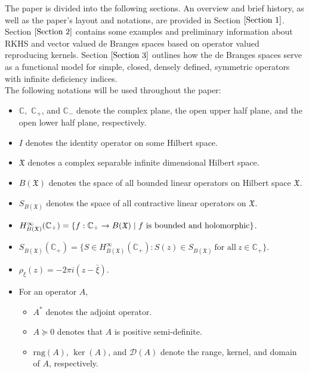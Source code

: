 \documentclass [12pt,reqno]{amsart}
\numberwithin{equation}{subsection}
\numberwithin{equation}{section}
\begin{document}
The paper is divided into the following sections. An overview and brief history, as well as the paper's layout and notations, are provided in Section $\ref{Section 1}$. Section $\ref{Section 2}$ contains some examples and preliminary information about RKHS and vector valued de Branges spaces based on operator valued reproducing kernels. Section $\ref{Section 3}$ outlines how the de Branges spaces serve as a functional model for simple, closed, densely defined, symmetric operators with infinite deficiency indices.
\\
The following notations will be used throughout the paper: 
\begin{itemize} 
\item $\mathbb{C},$ $\mathbb{C}_+$, and $\mathbb{C}_-$ denote the complex plane, the open upper half plane, and the open lower half plane, respectively. 
\item  $I$ denotes the identity operator on some Hilbert space.
\item $\mathfrak{X}$ denotes a complex separable infinite dimensional Hilbert space.
\item $B(\mathfrak{X})$ denotes the space of all bounded linear operators on Hilbert space $\mathfrak{X}$.
\item $S_{B(\mathfrak{X})}$ denotes the space of all contractive linear operators on $\mathfrak{X}.$
\item $H^{\infty}_{B(\mathfrak{X})}(\mathbb{C}_+)= \{ f: \mathbb{C}_+ \rightarrow B(\mathfrak{X}) \hspace{0.1cm}\vert\hspace{0.1cm} f~ \mbox{is bounded and holomorphic} \}$.
\item $S_{B(\mathfrak{X})}(\mathbb{C}_+) = \bigl \{ S \in H^{\infty}_{B(\mathfrak{X})}(\mathbb{C}_+) : S(z) \in S_{B(\mathfrak{X})} ~\mbox{for all}~ z \in \mathbb{C}_+ \bigl \} $. 
\item $\rho_\xi(z)= -2 \pi i (z-\bar{\xi})$.
\item For an operator $A$,
\begin{itemize}
\item [(i)]$A^*$ denotes the adjoint operator.
\item [(ii)]$A\succeq 0$ denotes that $A$ is positive semi-definite.
\item [(iii)] $\mathrm{rng} (A)$, $\ker (A)$, and $\mathcal{D}(A)$  denote the range, kernel, and domain of $A$, respectively.

\end{itemize}
\end{itemize}
\end{document}
